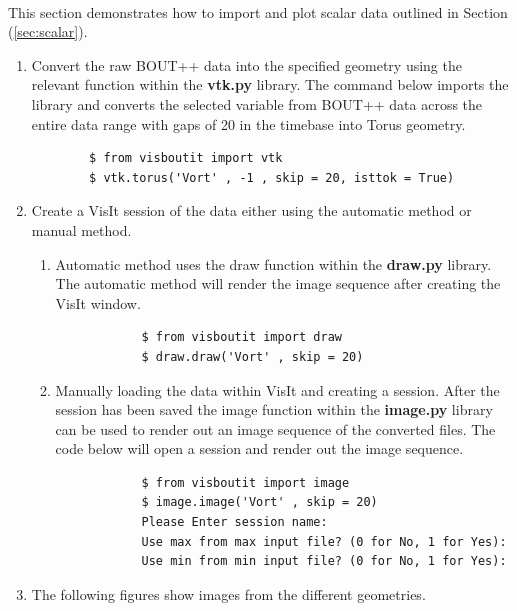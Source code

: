 \documentclass[12pt,a4paper]{article}
\begin{document}
\paragraph{} This section demonstrates how to import and plot scalar data outlined in Section (\ref{sec:scalar}).
\begin{enumerate}
	\item{Convert the raw BOUT++ data into the specified geometry using the relevant function within the \textbf{vtk.py} library. The command below imports the library and converts the selected variable from BOUT++ data across the entire data range with gaps of 20 in the timebase into Torus geometry.
		\begin{verbatim}
		$ from visboutit import vtk
		$ vtk.torus('Vort' , -1 , skip = 20, isttok = True)
		\end{verbatim}}
	\item{Create a VisIt session of the data either using the automatic method or manual method.}
	\begin{enumerate}
		\item{Automatic method uses the draw function within the \textbf{draw.py} library. The automatic method will render the image sequence after creating the VisIt window.
			\begin{verbatim}
			$ from visboutit import draw
			$ draw.draw('Vort' , skip = 20)
			\end{verbatim}
		}
		\item{Manually loading the data within VisIt and creating a session. After the session has been saved the image function within the \textbf{image.py} library can be used to render out an image sequence of the converted files. The code below will open a session and render out the image sequence.
			\begin{verbatim}
			$ from visboutit import image
			$ image.image('Vort' , skip = 20)
			Please Enter session name:
			Use max from max input file? (0 for No, 1 for Yes):
			Use min from min input file? (0 for No, 1 for Yes):
			\end{verbatim}
		}
	\end{enumerate}
	\item{The following figures show images from the different geometries.}
\end{enumerate}
\end{document}
